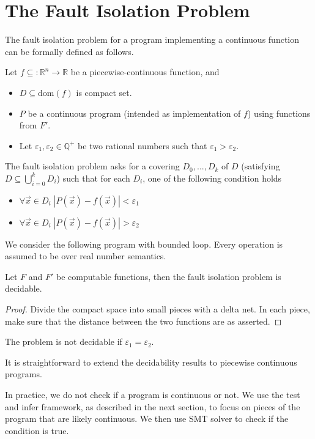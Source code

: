 \section{The Fault Isolation Problem}

The fault isolation problem for a program implementing a continuous function can be formally defined as follows. 
\begin{definition}
Let $f\subseteq: \mathbb{R}^n\rightarrow \mathbb{R}$ be a piecewise-continuous function, and 
\begin{itemize} 
\item $D\subseteq \mathrm{dom}(f)$ is compact set. 
\item $P$ be a continuous program (intended as implementation of $f$) using functions from $F'$. 
\item Let $\varepsilon_1,\varepsilon_2\in \mathbb{Q}^+$ be two rational numbers such that $\varepsilon_1>\varepsilon_2$. 
\end{itemize}
The fault isolation problem asks for a covering
$D_0, ..., D_k$
of $D$ (satisfying $D\subseteq \bigcup_{i=0}^k D_i$) 
such that for each $D_i$, one of the following condition holds
\begin{itemize}
\item $\forall \vec x\in D_i\;  |P(\vec x)-f(\vec x)|<\varepsilon_1$
\item $\forall \vec x\in D_i\;  |P(\vec x)-f(\vec x)|>\varepsilon_2$
\end{itemize}
\end{definition}

\begin{definition}
We consider the following program with bounded loop. Every operation is assumed to be over real number semantics. 
\end{definition}

\begin{theorem}
Let $F$ and $F'$ be computable functions, then the fault isolation problem is decidable. 
\end{theorem}
\begin{proof}
Divide the compact space into small pieces with a delta net. In each piece, make sure that the distance between the two functions are as asserted. 
\end{proof}

\begin{proposition}
The problem is not decidable if $\varepsilon_1 = \varepsilon_2$. 
\end{proposition}

It is straightforward to extend the decidability results to piecewise continuous programs. 

In practice, we do not check if a program is continuous or not. We use the test and infer framework, as described in the next section, to focus on pieces of the program that are likely continuous. We then use SMT solver to check if the condition is true. 




